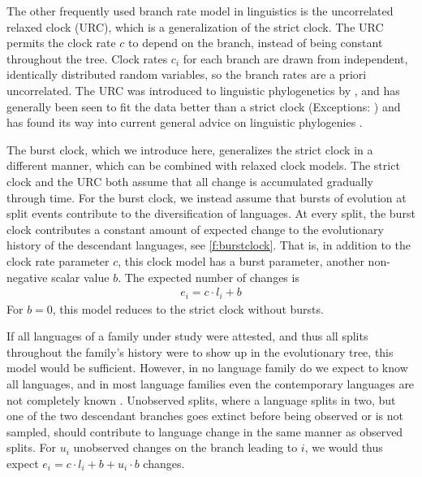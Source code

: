 \documentclass[]{rsos}%
\begin{document}
The other frequently used branch rate model in linguistics is the uncorrelated relaxed
clock (URC), which is a generalization of the strict clock.
The URC \parencite{drummond2006relaxed} permits the clock rate $c$ to depend on
the branch, instead of being constant throughout the tree. Clock
rates $c_i$ for each branch are drawn from independent, identically distributed random
variables, so the branch rates are a priori uncorrelated.
The URC was introduced to linguistic
phylogenetics by \textcite{kitchen2009bayesian}, and has generally been seen to
fit the data better than a strict clock
\parencite{bouckaert2012mapping,honkola2013cultural,lee2013evolution}
(Exceptions: \cite{savelyev2020bayesian,kaiping2021systematic})
and has found its way into current general advice on linguistic phylogenies
\parencite{maurits2017beastling,hoffmann2021bayesian}.

The burst clock, which we introduce here, generalizes the strict clock in a different manner, which can be combined with relaxed clock models.
The strict clock and the URC both assume that all change is accumulated gradually
through time.
For the burst clock, we instead assume that bursts of evolution at split events
contribute to the diversification of languages.
At every split, the burst clock contributes a
constant amount of expected change to the evolutionary history of the
descendant languages, see \cref{f:burstclock}. That is, in addition to the clock rate parameter $c$, this clock model
has a burst parameter, another non-negative scalar value $b$.
The expected number of changes is
\begin{align}
  e_i = c \cdot l_i + b
  \label{eq:simple-burst}
\end{align}
For $b=0$, this model reduces to the strict clock without bursts.

%

If all languages of a family under study were attested, and thus all splits throughout
the family's history were to show up in the evolutionary tree, this model would be sufficient.
However, in no language family do we expect to know all languages, and in most
language families even the contemporary languages are not completely known \parencite{glottoscope}. 
Unobserved splits, where a language splits in two, but one of
the two descendant branches goes extinct before being observed or is not sampled,
should contribute to language change in the same manner as observed splits.
For $u_i$ unobserved changes on the branch leading to $i$, we would thus expect $e_i = c \cdot l_i + b + u_i \cdot b$ changes.
\end{document}

